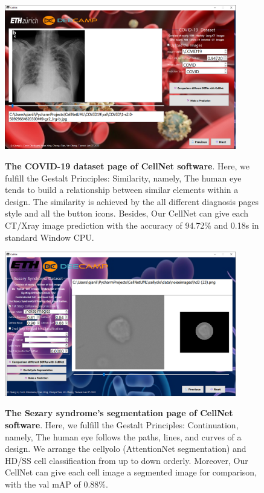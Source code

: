 {\begin{figure}[t]
\begin{center}
\includegraphics[height=0.3\textheight,width=0.9\textwidth]{thesis-template-master/images/cellnet4-3page.PNG}
\label{fig:cellnet}
\end{center}
\caption{ \textbf{The COVID-19 dataset page of CellNet software}. Here, we fulfill the Gestalt Principles: Similarity, namely, The human eye tends to build a relationship between similar elements within a design. The similarity is achieved by the all different diagnosis pages style and all the button icons. Besides, Our CellNet can give each CT/Xray image prediction with the accuracy of 94.72\% and 0.18s in standard Window CPU.}
\end{figure}


\begin{figure}[t]
\begin{center}
\includegraphics[height=0.3\textheight,width=0.9\textwidth]{thesis-template-master/images/cellnet5-1page.PNG}
\label{fig:cellnet}
\end{center}
\caption{ \textbf{The Sezary syndrome's segmentation page of CellNet software}. Here, we fulfill the Gestalt Principles: Continuation, namely, The human eye follows the paths, lines, and curves of a design. We arrange the cellyolo (AttentionNet segmentation) and HD/SS cell classification from up to down orderly. Moreover, Our CellNet can give each cell image a segmented image for comparison, with the val mAP of 0.88\%.}
\end{figure}


}
